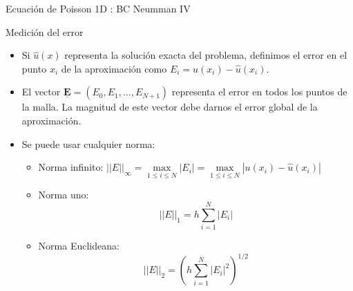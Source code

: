 \documentclass{beamer}
\newcommand{\Vector}[1]{{\underline{\mathbf{#1}}}}
\begin{document}
\begin{frame}{Ecuaci\'on de Poisson 1D : BC Neumman IV}
\begin{footnotesize}
\end{footnotesize}

\end{frame}

\begin{frame}{Medici\'on del error}

\begin{itemize}
\item Si $\hat{u}(x)$ representa la soluci\'on exacta del problema, definimos el error en el punto $x_i$ de la aproximaci\'on como $E_i = u(x_i) - \hat{u}(x_i)$. 

\item El vector $\Vector{E} = (E_0, E_1, \dots, E_{N+1})$ representa el error en todos los puntos de la malla. La magnitud de este vector debe darnos el error global de la aproximaci\'on. 

\item Se puede usar cualquier norma:

\begin{itemize}
\item Norma infinito: $ \displaystyle
|| E ||_\infty = \max\limits_{1 \leq i \leq N}|E_i| = \max\limits_{1 \leq i \leq N} |u(x_i) - \hat{u}(x_i) |$

\item Norma uno:
\[
||E||_1 = h \sum\limits_{i=1}^{N} |E_i|
\]

\item Norma Euclideana:
\[
||E||_2 = \left(h \sum\limits_{i=1}^{N} |E_i|^2 \right)^{1/2}
\]
\end{itemize}

\end{itemize}

\end{frame}
\end{document}
